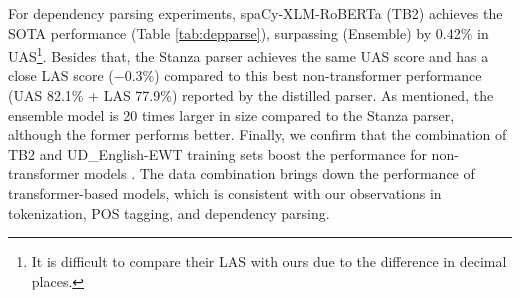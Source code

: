 \documentclass[10pt, a4paper]{article}
\begin{document}
For dependency parsing experiments, spaCy-XLM-RoBERTa (TB2) achieves the SOTA performance (Table \ref{tab:depparse}), surpassing  (Ensemble) by 0.42\% in UAS\footnote{It is difficult to compare their LAS with ours due to the difference in decimal places.}. Besides that, the Stanza parser achieves the same UAS score and has a close LAS score ($-$0.3\%) compared to this best non-transformer performance (UAS 82.1\% + LAS 77.9\%) reported by the distilled parser. As  mentioned, the ensemble model is 20 times larger in size compared to the Stanza parser, although the former performs better. Finally, we confirm that the combination of TB2 and UD\_English-EWT training sets boost the performance for non-transformer models \cite{liu2018parsing}. The data combination brings down the performance of transformer-based models, which is consistent with our observations in tokenization, POS tagging, and dependency parsing. 
\end{document}
